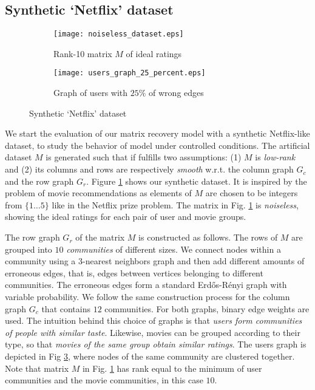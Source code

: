 \documentclass{article}
\begin{document}
\subsection{Synthetic `Netflix' dataset}
\vspace{-0.25cm}
\begin{figure}
\label{fig:artificial_data}
          \begin{subfigure}[b]{.5\linewidth}
            \centering\texttt{[image: noiseless\_dataset.eps]}
            \vspace{-0.25cm}
            \caption{Rank-10 matrix $M$ of ideal ratings}\label{fig:art_M_noiseless}
          \end{subfigure}
           \begin{subfigure}[b]{.5\linewidth}
            \centering \texttt{[image: users\_graph\_25\_percent.eps]}
            \vspace{-0.25cm}
            \caption{Graph of users with $25\%$ of wrong edges}\label{fig:artificial_G_u}
          \end{subfigure}
        \caption{Synthetic `Netflix' dataset}
	\vspace{-0.25cm}
\end{figure}
We start the evaluation of our matrix recovery model with a synthetic Netflix-like dataset, to study the behavior of model under controlled conditions. 
The artificial dataset $M$ is generated such that if fulfills two assumptions: (1) $M$ is \textit{low-rank} and (2) its columns and rows are respectively \textit{smooth} w.r.t. the column graph $G_c$ and the row graph $G_r$. 
Figure \ref{fig:art_M_noiseless} shows our synthetic dataset. It is inspired by the problem of movie recommendations as elements of $M$ are chosen to be integers from $\{1\hdots 5\}$ like in the Netflix prize problem. The matrix in Fig. \ref{fig:art_M_noiseless} is \textit{noiseless}, showing the ideal ratings for each pair of user and movie groups.  



The row graph $G_r$ of the matrix $M$ is constructed as follows. The rows of $M$ are grouped into $10$ \textit{communities} of different sizes. We connect nodes within a community using a $3$-nearest neighbors graph and then add different amounts of erroneous edges, that is, edges between vertices belonging to different communities. The erroneous edges form a standard Erd\H{o}s-R\'{e}nyi graph with variable probability. We follow the same construction process for the column graph $G_c$ that contains $12$ communities. For both graphs, binary edge weights are used. The intuition behind this choice of graphs is that \textit{users form communities of people with similar taste}. Likewise, movies can be grouped according to their type, so that \textit{movies of the same group obtain similar ratings}. The users graph is depicted in Fig \ref{fig:artificial_G_u}, where nodes of the same community are clustered together. Note that matrix $M$ in Fig. \ref{fig:art_M_noiseless} has rank equal to the minimum of user communities and the movie communities, in this case $10$. 
\end{document}
